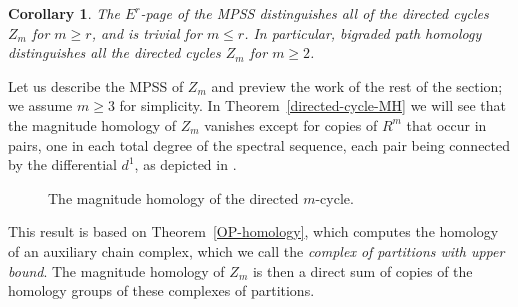 \documentclass[a4paper, 11 pt, oneside, reqno]{amsart}
\numberwithin{lemma}{section}
\newtheorem{corollary}[lemma]{Corollary}
\theoremstyle{definition}
\begin{document}
\begin{corollary}
    The \(E^r\)-page of the MPSS distinguishes all of the directed cycles \(Z_m\) for \(m \geq r\), and is trivial for \(m \leq r\). In particular, bigraded path homology distinguishes all the directed cycles \(Z_m\) for \(m \geq 2\).
\end{corollary}

Let us describe the MPSS of $Z_m$ and preview the work of the rest
of the section; we assume $m\geq 3$ for simplicity.
In Theorem~\ref{directed-cycle-MH} we will see that
the magnitude homology of $Z_m$ vanishes except for copies of
$R^m$ that occur in pairs, one in each total degree of the 
spectral sequence, each pair being connected by
the differential $d^1$, as depicted in .
\begin{figure}[h!]
    \centering
    \caption{The magnitude homology of the directed \(m\)-cycle.}
    \label{fig:E1_Zm}
\end{figure}
This result is based on Theorem~\ref{OP-homology},
which computes the homology
of an auxiliary chain complex, which we call the 
\emph{complex of partitions with upper bound}.
The magnitude homology of $Z_m$ is then a direct sum of
copies of the homology groups of these complexes of partitions.
\end{document}

